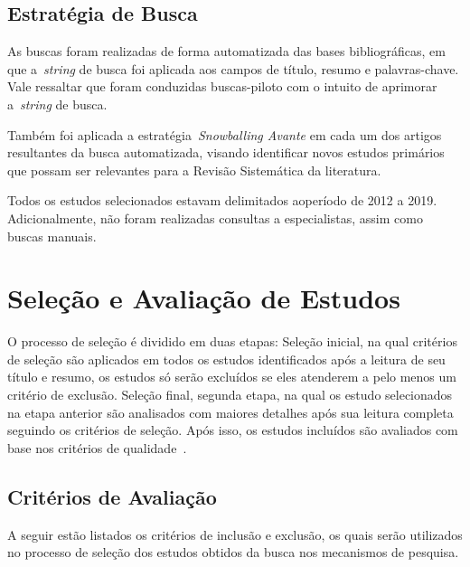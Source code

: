 \subsection{Estratégia de Busca}

As buscas foram realizadas de forma automatizada das bases bibliográficas, em que a~\emph{string} de busca foi aplicada aos campos de título, resumo e palavras-chave. 
Vale ressaltar que foram conduzidas buscas-piloto com o intuito de aprimorar a~\emph{string} de busca.

Também foi aplicada a estratégia~\emph{Snowballing Avante} em cada um dos artigos resultantes da busca automatizada, visando identificar novos estudos primários que possam ser relevantes para a Revisão Sistemática da literatura.

Todos os estudos selecionados estavam delimitados aoperíodo de 2012 a 2019. 
Adicionalmente, não foram realizadas consultas a especialistas, assim como buscas manuais.


\section{Seleção e Avaliação de Estudos}

O processo de seleção é dividido em duas etapas: Seleção inicial, na qual critérios de seleção são aplicados em todos os estudos identificados após a leitura de seu título e resumo, os estudos só serão excluídos se eles atenderem a pelo menos um critério de exclusão. Seleção final, segunda etapa, na qual os estudo selecionados na etapa anterior são analisados com maiores detalhes após sua leitura completa seguindo os critérios de seleção. Após isso, os estudos incluídos são avaliados com base nos critérios de qualidade~\citep{nakagawa2017revisao}. 

\subsection{Critérios de Avaliação}
A seguir estão listados os critérios de inclusão e exclusão, os quais serão utilizados no processo de seleção dos estudos obtidos da busca nos mecanismos de pesquisa.

